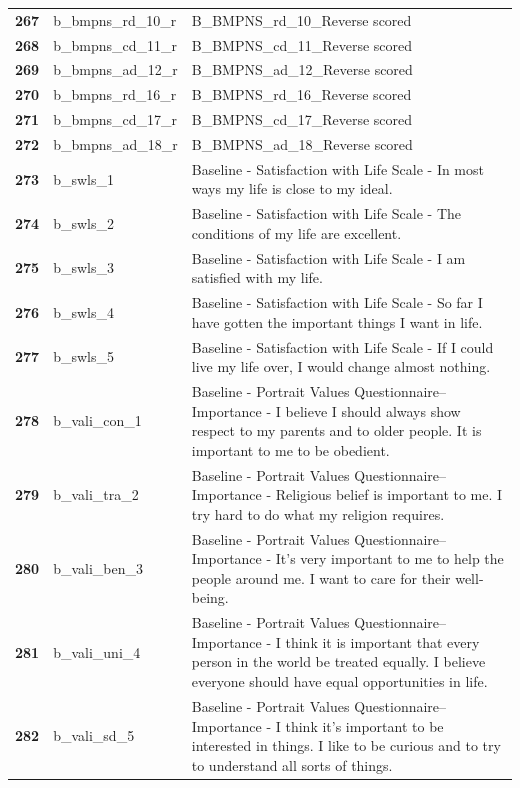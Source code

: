 \documentclass[
  letterpaper,
  DIV=11,
  numbers=noendperiod]{scrartcl}
\begin{document}
\begin{longtable}[t]{>{}cll}
\textbf{267} & b\_bmpns\_rd\_10\_r & B\_BMPNS\_rd\_10\_Reverse scored\\
\textbf{268} & b\_bmpns\_cd\_11\_r & B\_BMPNS\_cd\_11\_Reverse scored\\
\textbf{269} & b\_bmpns\_ad\_12\_r & B\_BMPNS\_ad\_12\_Reverse scored\\
\textbf{270} & b\_bmpns\_rd\_16\_r & B\_BMPNS\_rd\_16\_Reverse scored\\
\addlinespace
\textbf{271} & b\_bmpns\_cd\_17\_r & B\_BMPNS\_cd\_17\_Reverse scored\\
\textbf{272} & b\_bmpns\_ad\_18\_r & B\_BMPNS\_ad\_18\_Reverse scored\\
\textbf{273} & b\_swls\_1 & Baseline - Satisfaction with Life Scale - In most ways my life is close to my ideal.\\
\textbf{274} & b\_swls\_2 & Baseline - Satisfaction with Life Scale - The conditions of my life are excellent.\\
\textbf{275} & b\_swls\_3 & Baseline - Satisfaction with Life Scale - I am satisfied with my life.\\
\addlinespace
\textbf{276} & b\_swls\_4 & Baseline - Satisfaction with Life Scale - So far I have gotten the important things I want in life.\\
\textbf{277} & b\_swls\_5 & Baseline - Satisfaction with Life Scale - If I could live my life over, I would change almost nothing.\\
\textbf{278} & b\_vali\_con\_1 & Baseline - Portrait Values Questionnaire--Importance - I believe I should always show respect to my parents and to older people. It is important to me to be obedient.\\
\textbf{279} & b\_vali\_tra\_2 & Baseline - Portrait Values Questionnaire--Importance - Religious belief is important to me. I try hard to do what my religion requires.\\
\textbf{280} & b\_vali\_ben\_3 & Baseline - Portrait Values Questionnaire--Importance - It's very important to me to help the people around me. I want to care for their well-being.\\
\addlinespace
\textbf{281} & b\_vali\_uni\_4 & Baseline - Portrait Values Questionnaire--Importance - I think it is important that every person in the world be treated equally. I believe everyone should have equal opportunities in life.\\
\textbf{282} & b\_vali\_sd\_5 & Baseline - Portrait Values Questionnaire--Importance - I think it's important to be interested in things. I like to be curious and to try to understand all sorts of things.\\

\end{longtable}
\end{document}
